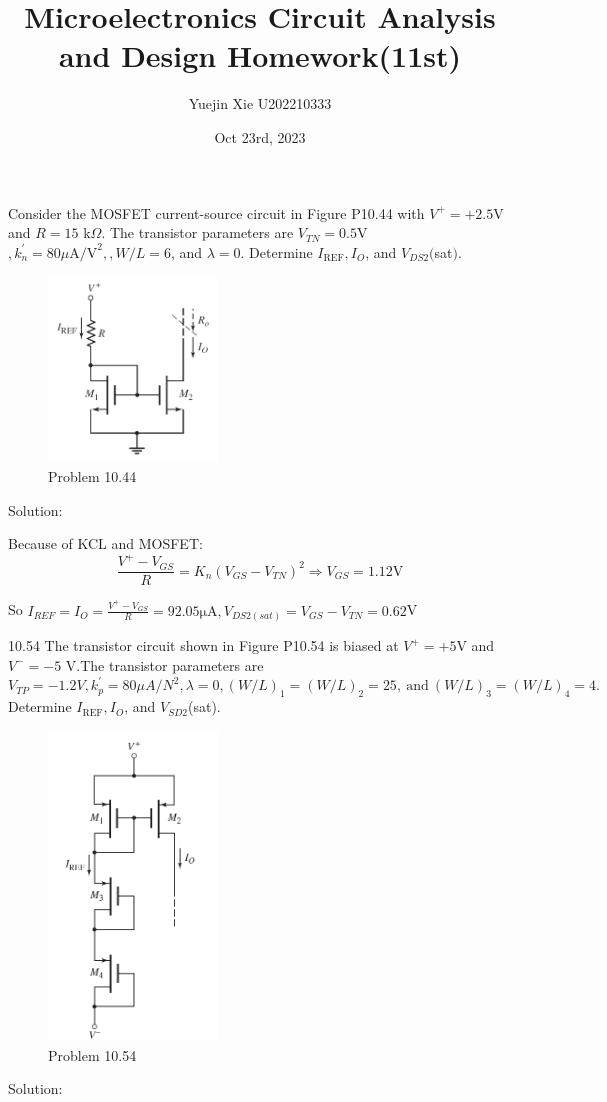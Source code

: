 \documentclass[a4paper,11pt,UTF8]{article}
\title{Microelectronics Circuit Analysis and Design Homework(11st)}
\author{Yuejin Xie \quad U202210333}
\date{Oct 23rd, 2023}
\begin{document}
 Consider the MOSFET current-source circuit in Figure P10.44 with $V^+=+ 2.5$V and $R= 15$ k$\Omega$. The transistor parameters are $V_{TN}= 0.5$V$, k_n^{\prime}= 80\mu\mathrm{A/V}^{2},, W/L= 6$, and $\lambda=0$. Determine $I_{\mathrm{REF}},I_{O}$, and $V_{DS2}( $sat$) .$
\begin{figure}[H]
	\centering
	\includegraphics[width=0.4\textwidth]{10.44}
	\caption{Problem 10.44}
\end{figure}
\noindent Solution:

Because of KCL and MOSFET:
$$\frac{V^+-V_{GS}}{R}=K_n(V_{GS}-V_{TN})^2\Rightarrow V_{GS}=1.12\mathrm{V}$$

So $\displaystyle I_{REF}=I_O=\frac{V^+-V_{GS}}{R}=92.05\mathrm{\mu A},V_{DS2(sat)}=V_{GS}-V_{TN}=0.62$V
  
10.54 The transistor circuit shown in Figure P10.54 is biased at $V^+=+5$V and $V^{-}=-5$ V.The transistor parameters are $V_{TP}=-1.2 V, k_p^{\prime}=80\mu A/N^2,\lambda=0,(W/L)_1=(W/L)_2=25,\mathrm{~and~}(W/L)_3=(W/L)_4=4.$ 
Determine $I_\mathrm{REF},I_O$, and $V_{SD2}$(sat).
\begin{figure}[H]
	\centering
	\includegraphics[width=0.4\textwidth]{10.54}
	\caption{Problem 10.54}
\end{figure}
\noindent Solution:
\end{document}
